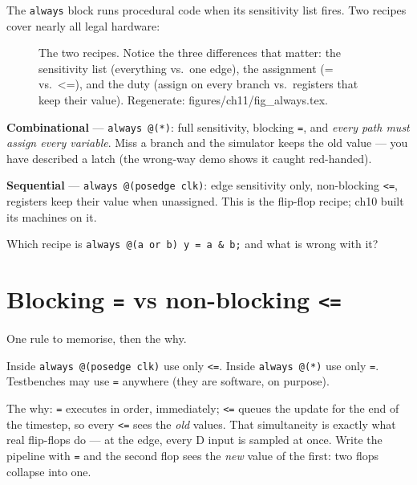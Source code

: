 The \texttt{always} block runs procedural
code when its sensitivity list fires. Two recipes cover nearly all
legal hardware:

\begin{figure}[htbp]
\centering

\caption{The two recipes. Notice the three differences that matter:
the sensitivity list (everything vs.\ one edge), the assignment
(= vs.\ <=), and the duty (assign on every branch vs.\ registers that
keep their value). Regenerate: \ttfamily figures/ch11/fig\_always.tex.}
\label{fig:always}
\end{figure}

\textbf{Combinational} --- \texttt{always @(*)}: full sensitivity,
blocking \texttt{=}, and \emph{every path must assign every variable}.
Miss a branch and the simulator keeps the old value --- you have
described a latch (the wrong-way demo shows it caught red-handed).

\textbf{Sequential} --- \texttt{always @(posedge clk)}: edge
sensitivity only, non-blocking \texttt{<=}, registers keep their value
when unassigned. This is the flip-flop recipe; ch10 built its machines
on it.

\begin{exercise}[easy]
Which recipe is \texttt{always @(a or b) y = a \& b;} and what is wrong
with it?
\end{exercise}

\section{Blocking \texttt{=} vs non-blocking \texttt{<=}}\label{sec:nb}

 One rule to
memorise, then the why.

\begin{rulebox}
Inside \texttt{always @(posedge clk)} use only \texttt{<=}.
Inside \texttt{always @(*)} use only \texttt{=}.
Testbenches may use \texttt{=} anywhere (they are software, on purpose).
\end{rulebox}

The why: \texttt{=} executes in order, immediately; \texttt{<=} queues
the update for the end of the timestep, so every \texttt{<=} sees the
\emph{old} values. That simultaneity is exactly what real flip-flops do
--- at the edge, every D input is sampled at once. Write the pipeline
with \texttt{=} and the second flop sees the \emph{new} value of the
first: two flops collapse into one.

